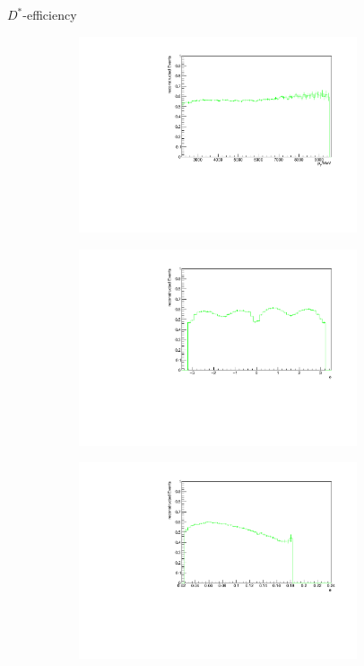 \documentclass[11pt]{beamer}
\begin{document}
\begin{frame}{$D^*$-efficiency}
\begin{figure}
\begin{subfigure}{0.45\textwidth}
\includegraphics[width=0.9\textwidth]{up_pdf/single/tot/h_pt_reco_Dst.pdf}
\end{subfigure}
\begin{subfigure}{0.45\textwidth}
\includegraphics[width=0.9\textwidth]{up_pdf/single/tot/h_phi_reco_Dst.pdf}
\end{subfigure}
\begin{subfigure}{0.45\textwidth}
\includegraphics[width=0.9\textwidth]{up_pdf/single/tot/h_theta_reco_Dst.pdf}

\end{subfigure}
\end{figure}
\end{frame}
\end{document}
